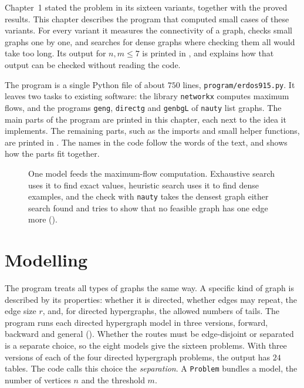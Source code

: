 
Chapter~1 stated the problem in its sixteen variants, together with the proved results.
This chapter describes the program that computed small cases of these variants.
For every variant it measures the connectivity of a graph, checks small graphs one by one, and searches for dense graphs where checking them all would take too long.
Its output for $n,m\le7$ is printed in , and  explains how that output can be checked without reading the code.

The program is a single Python file of about $750$ lines, \texttt{program/erdos915.py}.
It leaves two tasks to existing software: the library \texttt{networkx} \cite{HagbergSchultSwart08} computes maximum flows, and the programs \texttt{geng}, \texttt{directg} and \texttt{genbgL} of \texttt{nauty} list graphs.
The main parts of the program are printed in this chapter, each next to the idea it implements.
The remaining parts, such as the imports and small helper functions, are printed in .
The names in the code follow the words of the text, and  shows how the parts fit together.
\begin{figure}[ht]
\centering
\spinediagram
\caption{One model feeds the maximum-flow computation. Exhaustive search uses it to find exact values, heuristic search uses it to find dense examples, and the check with \texttt{nauty} takes the densest graph either search found and tries to show that no feasible graph has one edge more ().}
\label{fig:spine}
\end{figure}

\section{Modelling}
The program treats all types of graphs the same way.
A specific kind of graph is described by its properties: whether it is directed, whether edges may repeat, the edge size $r$, and, for directed hypergraphs, the allowed numbers of tails.
The program runs each directed hypergraph model in three versions, forward, backward and general ().
Whether the routes must be edge-disjoint or separated is a separate choice, so the eight models give the sixteen problems.
With three versions of each of the four directed hypergraph problems, the output has $24$ tables.
The code calls this choice the \emph{separation}.
A \texttt{Problem} bundles a model, the number of vertices $n$ and the threshold $m$.

